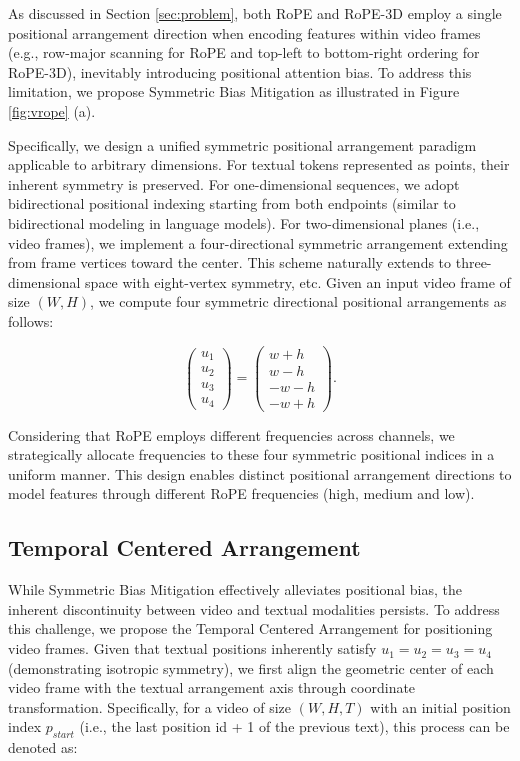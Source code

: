 \documentclass[11pt]{article}
\begin{document}
As discussed in Section \ref{sec:problem}, both RoPE and RoPE-3D employ a single positional arrangement direction when encoding features within video frames (e.g., row-major scanning for RoPE and top-left to bottom-right ordering for RoPE-3D), inevitably introducing positional attention bias. To address this limitation, we propose Symmetric Bias Mitigation as illustrated in Figure \ref{fig:vrope} (a).

Specifically, we design a unified symmetric positional arrangement paradigm applicable to arbitrary dimensions. For textual tokens represented as points, their inherent symmetry is preserved. For one-dimensional sequences, we adopt bidirectional positional indexing starting from both endpoints (similar to bidirectional modeling in language models). For two-dimensional planes (i.e., video frames), we implement a four-directional symmetric arrangement extending from frame vertices toward the center. This scheme naturally extends to three-dimensional space with eight-vertex symmetry, etc. Given an input video frame of size $(W, H)$, we compute four symmetric directional positional arrangements as follows:

\begin{equation}
\label{eq:symmetric}
\begin{pmatrix}
u_{1} \\
u_{2} \\
u_{3} \\
u_{4}
\end{pmatrix} = 
\begin{pmatrix}
w + h \\
w - h \\
-w - h \\
-w + h
\end{pmatrix}.
\end{equation}

Considering that RoPE employs different frequencies across channels, we strategically allocate frequencies to these four symmetric positional indices in a uniform manner. This design enables distinct positional arrangement directions to model features through different RoPE frequencies (high, medium and low).

\subsection{Temporal Centered Arrangement}

While Symmetric Bias Mitigation effectively alleviates positional bias, the inherent discontinuity between video and textual modalities persists. To address this challenge, we propose the Temporal Centered Arrangement for positioning video frames. Given that textual positions inherently satisfy $u_{1} = u_{2} = u_{3} = u_{4}$ (demonstrating isotropic symmetry), we first align the geometric center of each video frame with the textual arrangement axis through coordinate transformation. Specifically, for a video of size $(W, H, T)$ with an initial position index $p_{start}$ (i.e., the last position id + 1 of the previous text), this process can be denoted as:
\end{document}
